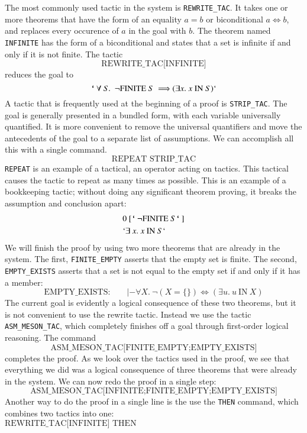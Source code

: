 \documentclass{llncs}
\def\bq{\text{\tt {`}\,}}
\begin{document}
The most commonly used tactic in the system is {\tt REWRITE\_TAC}.  It takes one or
more theorems that have the form of an equality $a=b$ or biconditional $a \Leftrightarrow b$, and replaces every occurence
of $a$ in the goal with $b$.  The theorem named {\tt INFINITE} has the form of
a biconditional and states that a set is infinite if and only if it is not finite.
The tactic
\[
\text{REWRITE\_TAC[INFINITE]}
\]
reduces the goal to
\[
\bq \forall~ S.~~ \lnot\text{FINITE}~ S~ \Longrightarrow (\exists x.~ x~\text{IN}~S)`
\]
A tactic that is frequently used at the beginning of a proof is {\tt STRIP\_TAC}.
The goal is generally presented in a bundled form, with each variable universally
quantified.  It is more convenient to remove the universal quantifiers and
move the antecedents of the goal to a separate list of assumptions.  We can
accomplish all this with a single command.
\[
\text{REPEAT STRIP\_TAC}
\]
{\tt REPEAT} is an example of a tactical, an operator acting on tactics.  This 
tactical causes the tactic to repeat as many times as possible. 
This is an example of a bookkeeping tactic;  without doing any significant theorem
proving, it breaks the assumption and conclusion apart:
\begin{align*}
  &0~[\bq\lnot\text{FINITE}~ S\bq]\\
  &`\exists~ x.~ x~ \text{IN}~ S`\\
\end{align*}
We will finish the proof by using two more theorems that are already in the system.
The first, {\tt FINITE\_EMPTY} asserts that the empty set is finite.  The second,
{\tt EMPTY\_EXISTS} asserts that a set is not equal to the empty set if and only if
it has a member:
\[
\text{EMPTY\_EXISTS:}\qquad |- \forall X.~\lnot(X = \{\}) \Leftrightarrow (\exists u.~u~\text{IN}~X)
\]
The current goal is evidently a logical consequence of these two theorems, but it is not convenient to use the rewrite tactic.  Instead we use the tactic {\tt ASM\_MESON\_TAC},
which completely finishes off a goal through first-order logical reasoning.  The command
\[
\text{ASM\_MESON\_TAC[FINITE\_EMPTY;EMPTY\_EXISTS]}
\]
completes the proof.  As we look over the tactics used in the proof,
we see that everything we did was a logical consequence of three
theorems that were already in the system.  We can now redo the proof
in a single step:
\[
\text{ASM\_MESON\_TAC[INFINITE;FINITE\_EMPTY;EMPTY\_EXISTS]}
\]
Another way to do the proof in a single line is the use the {\tt THEN} command,
which combines two tactics into one:
\[
\text{REWRITE\_TAC[INFINITE] THEN ASM\_MESON\_TAC[FINITE\_EMPTY;EMPTY\_EXISTS]}
\]
\end{document}
